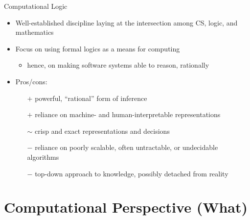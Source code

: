 \documentclass[presentation]{beamer}\mode<presentation>{\usetheme{AMSBolognaFC}}
\begin{document}

\begin{frame}{Computational Logic}
    \begin{itemize}
        \item Well-established discipline laying at the intersection among CS, logic, and mathematics
        
        \vfill 
        
        \item Focus on using formal logics as a means for computing
        \begin{itemize}
            \item hence, on making software systems able to reason, rationally
        \end{itemize}
        
        \vfill

        \item Pros/cons:
        \begin{itemize}
            \item[$+$] powerful, ``rational'' form of inference
            \item[$+$] reliance on machine- and human-interpretable representations
            \item[$\sim$] crisp and exact representations and decisions
            \item[$-$] reliance on poorly scalable, often untractable, or undecidable algorithms
            \item[$-$] top-down approach to knowledge, possibly detached from reality
        \end{itemize}
    \end{itemize}
\end{frame}

\section{Computational Perspective (What)}
\end{document}
